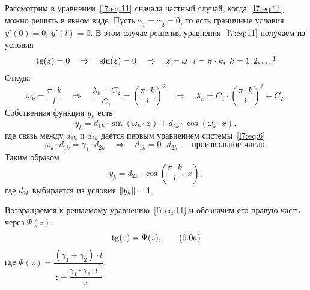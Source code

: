 Рассмотрим в уравнении~\eqref{l7:eq:11} сначала частный случай, когда~\eqref{l7:eq:11} можно решить в явном виде. Пусть $\gamma_1=\gamma_2=0$, то есть граничные условия $y'(0)=0$, $y'(l)=0$. В этом случае решения уравнения~\eqref{l7:eq:11} получаем из условия
\begin{equation*}
	\Tang(z)=0\quad\Rightarrow\quad\sin(z)=0\quad\Rightarrow\quad z=\omega\cdot l=\pi\cdot k,\ k=1,2,\ldots\footnotemark{}
\end{equation*} Откуда
\begin{equation*}
	\omega_k=\frac{\pi\cdot k}{l}\quad\Rightarrow\quad\frac{\lambda_k-C_2}{C_1}=\left(\frac{\pi\cdot k}{l}\right)^2\quad\Rightarrow\quad\lambda_k=C_1\cdot\left(\frac{\pi\cdot k}{l}\right)^2+C_2.
\end{equation*}
Собственная функция $y_k$ есть
\begin{equation*}
	 y_k=d_{1k}\cdot\sin(\omega_k\cdot x)+d_{2k}\cdot\cos(\omega_k\cdot x),
\end{equation*}
где связь между $d_{1k}$ и $d_{2k}$ даётся первым уравнением системы~\eqref{l7:eq:6}
\begin{equation*}
	\omega_k\cdot d_{1k}=\gamma_1\cdot d_{2k}\quad\Rightarrow\quad d_{1k}=0,\ d_{2k}\text{ --- произвольное число.}
\end{equation*}
Таким образом 
\begin{equation*}
	 y_k=d_{2k}\cdot\cos\left(\frac{\pi\cdot k}{l}\cdot x\right),
\end{equation*}
где $d_{2k}$ выбирается из условия $\left\|y_k\right\|=1$.

Возвращаемся к решаемому уравнению~\eqref{l7:eq:11} и обозначим его правую часть через $\Psi(z)$:
\begin{equation}
	\label{l7:eq:11a}
	\Tang(z)=\Psi(z),\tag{\theequation a}
\end{equation}	
где $\Psi(z)=\dfrac{(\gamma_1+\gamma_2)\cdot l}{z-\dfrac{\gamma_1\cdot\gamma_2\cdot l^2}{z}}.$

